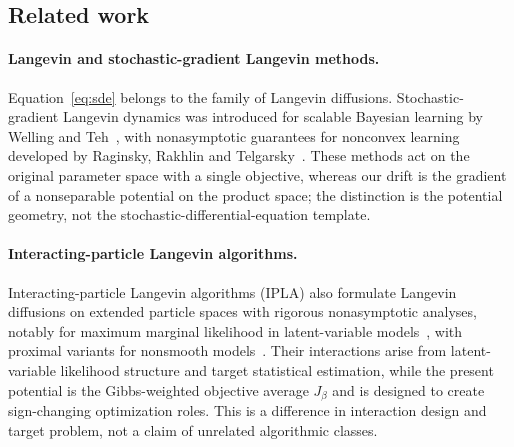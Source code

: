 \documentclass{article}
\theoremstyle{plain}
\theoremstyle{definition}
\theoremstyle{remark}
\begin{document}
\subsection{Related work}
\label{sec:related-work}

\paragraph{Langevin and stochastic-gradient Langevin methods.} Equation~\eqref{eq:sde} belongs to the family of Langevin diffusions. Stochastic-gradient Langevin dynamics was introduced for scalable Bayesian learning by Welling and Teh~\cite{welling2011bayesian}, with nonasymptotic guarantees for nonconvex learning developed by Raginsky, Rakhlin and Telgarsky~\cite{raginsky2017nonconvex}. These methods act on the original parameter space with a single objective, whereas our drift is the gradient of a nonseparable potential on the product space; the distinction is the potential geometry, not the stochastic-differential-equation template.

\paragraph{Interacting-particle Langevin algorithms.}
Interacting-particle Langevin algorithms (IPLA) also formulate Langevin diffusions on extended particle spaces with rigorous nonasymptotic analyses, notably for maximum marginal likelihood in latent-variable models~\cite{akyildiz2025interacting}, with proximal variants for nonsmooth models~\cite{encinar2025proximal}. Their interactions arise from latent-variable likelihood structure and target statistical estimation, while the present potential is the Gibbs-weighted objective average \(J_\beta\) and is designed to create sign-changing optimization roles. This is a difference in interaction design and target problem, not a claim of unrelated algorithmic classes.
\end{document}
